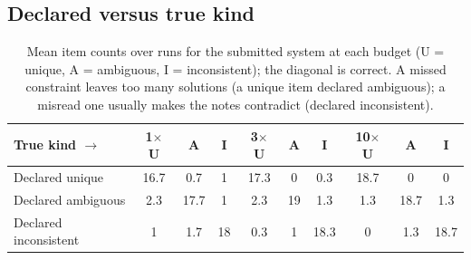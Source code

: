 \documentclass[10pt]{article}
\begin{document}
\subsection*{Declared versus true kind}
\begin{table}[H]
\centering\footnotesize\setlength{\tabcolsep}{3.5pt}\renewcommand{\arraystretch}{1.08}
\begin{tabular}{@{}l ccc ccc ccc@{}}
\toprule
True kind $\rightarrow$ & 1$\times$ U & A & I & 3$\times$ U & A & I & 10$\times$ U & A & I \\
\midrule
Declared unique & 16.7 & 0.7 & 1 & 17.3 & 0 & 0.3 & 18.7 & 0 & 0 \\
Declared ambiguous & 2.3 & 17.7 & 1 & 2.3 & 19 & 1.3 & 1.3 & 18.7 & 1.3 \\
Declared inconsistent & 1 & 1.7 & 18 & 0.3 & 1 & 18.3 & 0 & 1.3 & 18.7 \\
\bottomrule
\end{tabular}
\caption{Mean item counts over runs for the submitted system at each budget (U = unique, A = ambiguous, I = inconsistent); the diagonal is correct. A missed constraint leaves too many solutions (a unique item declared ambiguous); a misread one usually makes the notes contradict (declared inconsistent).}
\end{table}
\end{document}
